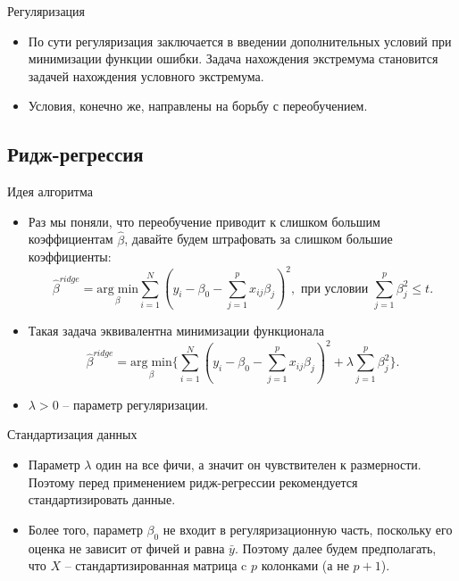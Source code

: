\documentclass[9pt]{beamer}
\begin{document}
\begin{frame}{Регуляризация}
\begin{itemize}
    \item По сути регуляризация заключается в введении дополнительных условий при минимизации функции ошибки. Задача нахождения экстремума становится задачей нахождения условного экстремума.
    \item Условия, конечно же, направлены на борьбу с переобучением.
\end{itemize}
\end{frame}

\subsection{Ридж-регрессия}

\begin{frame}{Идея алгоритма}
    \begin{itemize}
        \item Раз мы поняли, что переобучение приводит к слишком большим коэффициентам $\hat \beta$, давайте будем штрафовать за слишком большие коэффициенты:
        $$ \hat\beta^{ridge} = \underset{\beta}{\mathrm{arg\;min}} \sum_{i=1}^N \left(y_i -\beta_0 - \sum_{j=1}^p x_{ij}\beta_j\right)^2, \text{ при условии } \sum_{j=1}^p\beta_j^2 \leq t.$$
        \item Такая задача эквивалентна минимизации функционала
        $$\hat\beta^{ridge} = \underset{\beta}{\mathrm{arg\;min}} \bigg\{ \sum_{i=1}^N \left(y_i -\beta_0 - \sum_{j=1}^p x_{ij}\beta_j\right)^2 + \lambda\sum_{j=1}^p\beta_j^2 \bigg\}.$$
        \item $\lambda > 0$ -- параметр регуляризации.
    \end{itemize}
\end{frame}

\begin{frame}{Стандартизация данных}
\begin{itemize}
    \item Параметр $\lambda$ один на все фичи, а значит он чувствителен к размерности. Поэтому перед применением ридж-регрессии рекомендуется стандартизировать данные.
    \item Более того, параметр $\beta_0$ не входит в регуляризационную часть, поскольку его оценка не зависит от фичей и равна $\bar y$. Поэтому далее будем предполагать, что $X$ -- стандартизированная матрица c $p$ колонками (а не $p+1$).
\end{itemize}
\end{frame}
\end{document}
